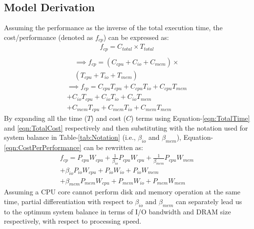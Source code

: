 \documentclass[journal]{IEEEtran}
\begin{document}
\subsection{Model Derivation}
Assuming the performance as the inverse of the total execution time, the cost/performance (denoted as $f_{cp}$) can be expressed as:
\begin{equation} %
\begin{split}
f_{cp} = C_{total} \times T_{total} \\
\end{split}
\end{equation}
\begin{equation} %
\begin{split}
\implies f _{cp}= (C_{cpu} + C_{io} + C_{mem}) \times\\ 
(T_{cpu} + T_{io} + T_{mem}) 
\end{split}
\end{equation}
\begin{equation} \label{eqn:CostPerPerformance}
\begin{split}
\implies f_{cp} = C_{cpu}T_{cpu} + C_{cpu}T_{io} + C_{cpu}T_{mem} \\
   + C_{io}T_{cpu} + C_{io}T_{io} + C_{io}T_{mem} \\
   + C_{mem}T_{cpu} + C_{mem}T_{io} + C_{mem}T_{mem} 
\end{split}
\end{equation}
By expanding all the time ($T$) and cost ($C$) terms using Equation-\ref{eqn:TotalTime} and \ref{eqn:TotalCost} respectively and then substituting with the notation used for system balance in Table-\ref{tab:Notation} (i.e., $\beta_{io}$ and $\beta_{mem}$),  Equation-\ref{eqn:CostPerPerformance} can be rewritten as:
\begin{equation}\label{eqn:CostPerPerformanceBalance}
\begin{split}
f_{cp} = P_{cpu}W_{cpu} + \frac{1}{\beta_{io}}P_{cpu}W_{cpu} + \frac{1}{\beta_{mem}}P_{cpu}W_{mem} \\
+ \beta_{io}P_{io}W_{cpu} + P_{io}W_{io} + P_{io}W_{mem}\\
+ \beta_{mem}P_{mem}W_{cpu} + P_{mem}W_{io} + P_{mem}W_{mem}
\end{split}
\end{equation}
Assuming a CPU core cannot perform disk and memory operation at the same time, partial differentiation with respect to $\beta_{io}$ and $\beta_{mem}$ can separately lead us to the optimum system balance in terms of I/O bandwidth and DRAM size respectively, with respect to processing speed.  
\end{document}

